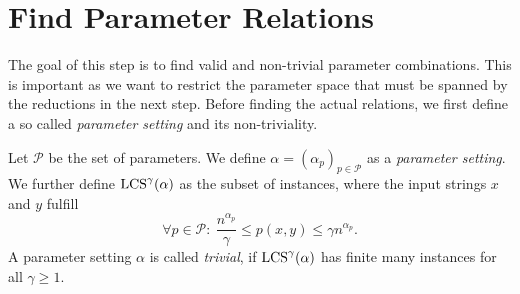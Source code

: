 \section{Find Parameter Relations}
\label{sec:fin_param_rels}
The goal of this step is to find valid and non-trivial parameter combinations.
This is important as we want to restrict the parameter space that must be spanned by the reductions in the next step.
Before finding the actual relations, we first define a so called \emph{parameter setting} and its non-triviality.

\begin{definition}
Let $\mathcal{P}$ be the set of parameters.
We define $\mathbb{\alpha} = (\alpha_p)_{p \in \mathcal{P}}$ as a \emph{parameter setting}.
We further define $\text{LCS}^\gamma(\mathbb{\alpha})$ as the subset of \lcs{} instances, where the input strings $x$ and $y$ fulfill
\begin{displaymath}
	\forall p \in \mathcal{P}: \  \frac{n^{\alpha_p}}{\gamma} \leq p(x,y) \leq \gamma n^{\alpha_p}.
\end{displaymath}
A parameter setting $\mathbb{\alpha}$ is called \emph{trivial}, if $\text{LCS}^\gamma(\alpha)$ has finite many instances for all $\gamma \geq 1$.
\end{definition}
%


